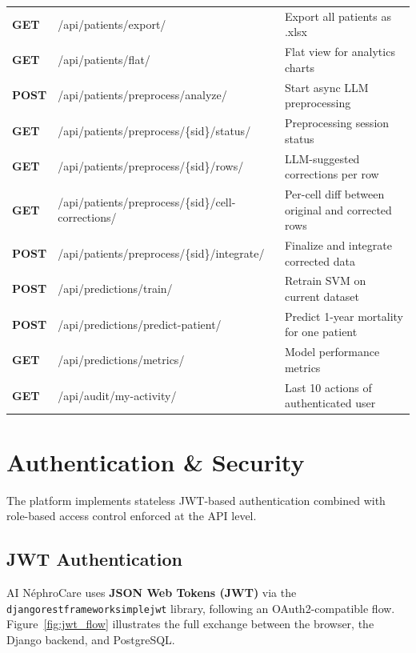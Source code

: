 \documentclass[12pt,a4paper,twoside]{report}
\begin{document}
\begin{longtable}{@{}
  >{\bfseries\footnotesize}p{1.3cm}
  >{\footnotesize\ttfamily\raggedright\arraybackslash}p{6.8cm}
  >{\footnotesize\raggedright\arraybackslash}p{5.5cm}@{}}
GET    & /api/patients/export/                      & Export all patients as .xlsx \\
GET    & /api/patients/flat/                        & Flat view for analytics charts \\
POST   & /api/patients/preprocess/analyze/          & Start async LLM preprocessing \\
GET    & /api/patients/preprocess/\{sid\}/status/   & Preprocessing session status \\
GET    & /api/patients/preprocess/\{sid\}/rows/     & LLM-suggested corrections per row \\
GET    & /api/patients/preprocess/\{sid\}/\newline{}cell-corrections/   & Per-cell diff between original and corrected rows \\
POST   & /api/patients/preprocess/\{sid\}/\newline{}integrate/          & Finalize and integrate corrected data \\
POST   & /api/predictions/train/                    & Retrain SVM on current dataset \\
POST   & /api/predictions/predict-patient/          & Predict 1-year mortality for one patient \\
GET    & /api/predictions/metrics/                  & Model performance metrics \\
GET    & /api/audit/my-activity/                    & Last 10 actions of authenticated user \\
\end{longtable}

\section{Authentication \& Security}\label{sec:auth}

The platform implements stateless JWT-based authentication combined with role-based access control enforced at the API level.

\subsection{JWT Authentication}

AI NéphroCare uses \textbf{JSON Web Tokens (JWT)} via the \texttt{django\-restframe\-work\-simplejwt} library, following an OAuth2-compatible flow. Figure~\ref{fig:jwt_flow} illustrates the full exchange between the browser, the Django backend, and PostgreSQL.
\end{document}
